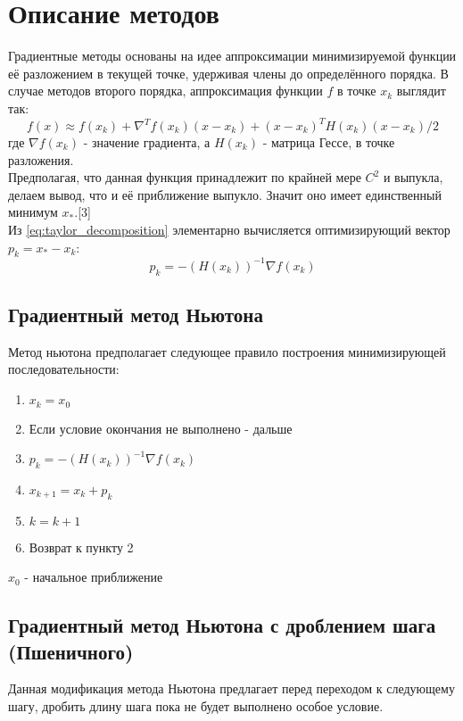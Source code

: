 \section{Описание методов}
\label{sec:methods}

Градиентные методы основаны на идее аппроксимации минимизируемой функции её разложением в текущей точке, удерживая члены до определённого порядка.
В случае методов второго порядка, аппроксимация функции $f$ в точке $x_k$ выглядит так:
\begin{equation}
    f(x) \approx f(x_k) + \nabla^{T}f(x_k)(x - x_k) + (x - x_k)^{T}H(x_k)(x - x_k)/2
    \label{eq:taylor_decomposition}
\end{equation}
\noindent где $\nabla{f(x_k)}$ - значение градиента, а $H(x_k)$ - матрица Гессе, в точке разложения.\\
Предполагая, что данная функция принадлежит по крайней мере $C^2$ и выпукла, делаем вывод, что и её приближение выпукло.
Значит оно имеет единственный минимум $x_*$.[3]\\
Из \eqref{eq:taylor_decomposition} элементарно вычисляется оптимизирующий вектор $p_k = x_* - x_k$:\\
\begin{equation}
    p_k = -(H(x_k))^{-1}{\nabla}f(x_k)
    \label{eq:aprox_optim_vector}
\end{equation}

\subsection{Градиентный метод Ньютона}
\label{subsec:theory_newton}

Метод ньютона предполагает следующее правило построения минимизирующей последовательности:
\begin{enumerate}
    \item $x_k = x_0$
    \item Если условие окончания не выполнено - дальше
    \item $p_k = -(H(x_k))^{-1}{\nabla}f(x_k)$
    \item $x_{k+1} = x_k + p_k$
    \item  $k = k + 1$
    \item Возврат к пункту 2
\end{enumerate}
$x_0$ - начальное приближение

\subsection{Градиентный метод Ньютона с дроблением шага (Пшеничного)}
\label{subsec:theory_pschen}
Данная модификация метода Ньютона предлагает перед переходом к следующему шагу,
дробить длину шага пока не будет выполнено особое условие.

